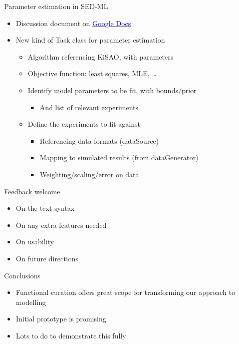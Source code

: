 \documentclass[t,xcolor={usenames,dvipsnames}]{beamer}
\newcommand{\myhref}[2]{\href{#1}{\textcolor{Blue}{#2}}}
\newcommand{\subitem}[1]{\begin{itemize}[<.->]\item #1 \end{itemize}}
\begin{document}
\begin{frame}{Parameter estimation in SED-ML}
\begin{itemize}
\item Discussion document on \myhref{https://docs.google.com/document/d/1rrs0fYuKFr4fgL1b7eGwSnaLhRPW6NdXwAaJY0ZN_WY/edit}{Google Docs}
\item New kind of Task class for parameter estimation
  \begin{itemize}
  \item Algorithm referencing KiSAO, with parameters
  \item Objective function: least squares, MLE, \ldots
  \item Identify model parameters to be fit, with bounds/prior
    \subitem{And list of relevant experiments}
  \item Define the experiments to fit against
    \begin{itemize}
    \item Referencing data formats (dataSource)
    \item Mapping to simulated results (from dataGenerator)
    \item Weighting/scaling/error on data
    \end{itemize}
  \end{itemize}
\end{itemize}
\end{frame}


\begin{frame}{Feedback welcome}
\begin{itemize}
\item On the text syntax
\item On any extra features needed
\item On usability
\item On future directions
\end{itemize}
\end{frame}


\begin{frame}{Conclusions}
\begin{itemize}
\item Functional curation offers great scope for transforming our approach to modelling
\item Initial prototype is promising
\item Lots to do to demonstrate this fully
\end{itemize}
\end{frame}
\end{document}
